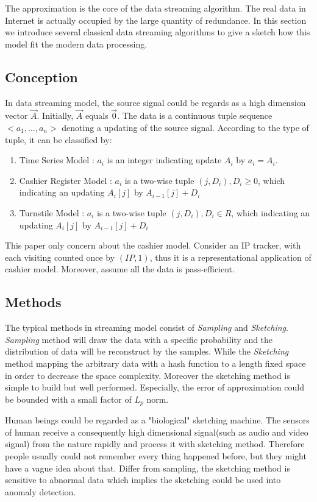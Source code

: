 \documentclass{article} %
\begin{document}
The approximation is the core of the data streaming algorithm. The real data in Internet is actually occupied by the large quantity of redundance. In this section we introduce several classical data streaming algorithms to give a sketch how this model fit the modern data processing.

\subsection{Conception}
In data streaming model, the source signal could be regards as a high dimension vector $\vec{A}$. Initially, $\vec{A}$ equals $\vec{0}$.  The data is a continuous tuple sequence $<a_1, ..., a_n>$ denoting a updating of the source signal. According to the type of tuple, it can be classified by:
\begin{enumerate}
\item Time Series Model : $a_i$ is an integer indicating update $A_i$ by $a_i = A_i$.
\item Cashier Register Model : $a_i$ is a two-wise tuple $(j, D_i), D_i \ge 0$, which indicating an updating $A_i[j]$ by $A_{i-1}[j] + D_i$
\item Turnstile Model : $a_i$ is a two-wise tuple $(j, D_i), D_i \in R$, which indicating an updating $A_i[j]$ by $A_{i-1}[j] + D_i$
\end{enumerate}
This paper only concern about the cashier model. Consider an IP tracker, with each visiting counted once by $(IP, 1)$, thus it is a representational application of cashier model. Moreover, assume all the data is pass-efficient.

\subsection{Methods}
The typical methods in streaming model consist of \emph{Sampling} and \emph{Sketching}. \emph{Sampling} method will draw the data with a specific probability and the distribution of data will be reconstruct by the samples. While the \emph{Sketching} method mapping the arbitrary data with a hash function to a length fixed space in order to decrease the space complexity. Moreover the sketching method is simple to build but well performed. Especially, the error of approximation could be bounded with a small factor of $L_p$ norm.

Human beings could be regarded as a "biological" sketching machine. The sensors of human receive a consequently high dimensional signal(such as audio and video signal) from the nature rapidly and process it with sketching method. Therefore people usually could not remember every thing happened before, but they might have a vague idea about that. Differ from sampling, the sketching method is sensitive to abnormal data which implies the sketching could be used into anomaly detection.
\end{document}

